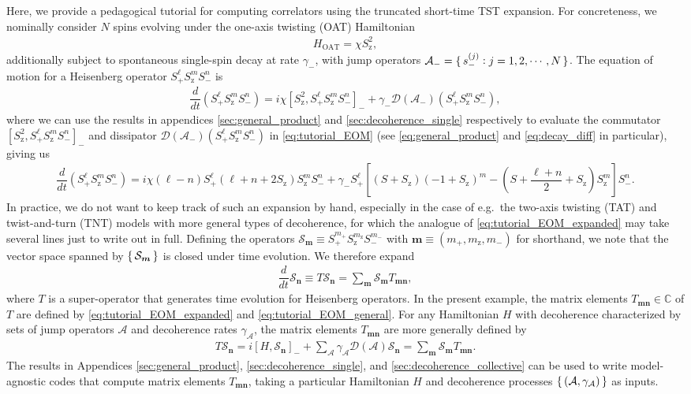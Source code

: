 \documentclass[pra,twocolumn,longbibliography]{revtex4-2}
\renewcommand{\t}{\text} %
\newcommand{\f}[2]{\dfrac{#1}{#2}} %
\newcommand{\p}[1]{\left( #1 \right)} %
\renewcommand{\sp}[1]{\left[ #1 \right]} %
\renewcommand{\v}{\bm} %
\newcommand{\A}{\mathcal{A}}
\newcommand{\D}{\mathcal{D}}
\renewcommand{\S}{\mathcal{S}}
\newcommand{\C}{\mathbb{C}}
\newcommand{\z}{\text{z}}
\newcommand{\1}{\mathds{1}}
\begin{document}
Here, we provide a pedagogical tutorial for computing correlators
using the truncated short-time TST expansion.  For concreteness, we
nominally consider $N$ spins evolving under the one-axis twisting
(OAT) Hamiltonian
\begin{align}
  H_{\t{OAT}} = \chi S_\z^2,
\end{align}
additionally subject to spontaneous single-spin decay at rate
$\gamma_-$, with jump operators $\A_-=\set{s_-^{(j)}:j=1,2,\cdots,N}$.
The equation of motion for a Heisenberg operator
$S_+^\ell S_\z^m S_-^n$ is
\begin{align}
  \f{d}{dt} \p{S_+^\ell S_\z^m S_-^n}
  = i\chi\sp{S_\z^2, S_+^\ell S_\z^m S_-^n}_-
  + \gamma_- \D\p{\A_-} \p{S_+^\ell S_\z^m S_-^n},
  \label{eq:tutorial_EOM}
\end{align}
where we can use the results in appendices \ref{sec:general_product}
and \ref{sec:decoherence_single} respectively to evaluate the
commutator $\sp{S_\z^2, S_+^\ell S_\z^m S_-^n}_-$ and dissipator
$\D\p{\A_-} \p{S_+^\ell S_\z^m S_-^n}$ in \eqref{eq:tutorial_EOM} (see
\eqref{eq:general_product} and \eqref{eq:decay_diff} in particular),
giving us
\begin{align}
  \f{d}{dt} \p{S_+^\ell S_\z^m S_-^n} =
  i\chi \p{\ell-n} S_+^\ell \p{\ell+n+2S_\z} S_\z^m S_-^n
  + \gamma_- S_+^\ell \sp{\p{S+S_\z}\p{-1+S_\z}^m
    - \p{S+\f{\ell+n}{2}+S_\z} S_\z^m} S_-^n.
  \label{eq:tutorial_EOM_expanded}
\end{align}
In practice, we do not want to keep track of such an expansion by
hand, especially in the case of e.g.~the two-axis twisting (TAT) and
twist-and-turn (TNT) models with more general types of decoherence,
for which the analogue of \eqref{eq:tutorial_EOM_expanded} may take
several lines just to write out in full.  Defining the operators
$\S_{\v m}\equiv S_+^{m_+} S_\z^{m_\z} S_-^{m_-}$ with
$\v m\equiv\p{m_+,m_\z,m_-}$ for shorthand, we note that the vector
space spanned by $\set{\S_{\v m}}$ is closed under time evolution.  We
therefore expand
\begin{align}
  \f{d}{dt} \S_{\v n} \equiv T \S_{\v n}
  = \sum_{\v m} \S_{\v m} T_{\v m\v n},
  \label{eq:tutorial_EOM_general}
\end{align}
where $T$ is a super-operator that generates time evolution for
Heisenberg operators.  In the present example, the matrix elements
$T_{\v m\v n}\in\C$ of $T$ are defined by
\eqref{eq:tutorial_EOM_expanded} and \eqref{eq:tutorial_EOM_general}.
For any Hamiltonian $H$ with decoherence characterized by sets of jump
operators $\A$ and decoherence rates $\gamma_\A$, the matrix elements
$T_{\v m\v n}$ are more generally defined by
\begin{align}
  T \S_{\v n}
  = i\sp{H,\S_{\v n}}_- + \sum_\A \gamma_\A \D\p{\A} \S_{\v n}
  = \sum_{\v m} \S_{\v m} T_{\v m\v n}.
\end{align}
The results in Appendices \ref{sec:general_product},
\ref{sec:decoherence_single}, and \ref{sec:decoherence_collective} can
be used to write model-agnostic codes that compute matrix elements
$T_{\v m\v n}$, taking a particular Hamiltonian $H$ and decoherence
processes $\set{\p{\A,\gamma_\A}}$ as inputs.
\end{document}
